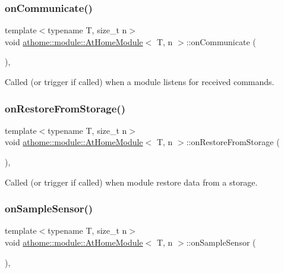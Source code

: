 \subsubsection{\texorpdfstring{on\+Communicate()}{onCommunicate()}}
{\footnotesize\ttfamily template$<$typename T, size\+\_\+t n$>$ \\
void \mbox{\hyperlink{classathome_1_1module_1_1_at_home_module}{athome\+::module\+::\+At\+Home\+Module}}$<$ T, n $>$\+::on\+Communicate (\begin{DoxyParamCaption}{ }\end{DoxyParamCaption})\hspace{0.3cm}{\ttfamily [inline]}, {\ttfamily [protected]}}

Called (or trigger if called) when a module listens for received commands. \mbox{\label{classathome_1_1module_1_1_at_home_module_a7608679045f46ef0c07d7eab430d755b}} 
\subsubsection{\texorpdfstring{on\+Restore\+From\+Storage()}{onRestoreFromStorage()}}
{\footnotesize\ttfamily template$<$typename T, size\+\_\+t n$>$ \\
void \mbox{\hyperlink{classathome_1_1module_1_1_at_home_module}{athome\+::module\+::\+At\+Home\+Module}}$<$ T, n $>$\+::on\+Restore\+From\+Storage (\begin{DoxyParamCaption}{ }\end{DoxyParamCaption})\hspace{0.3cm}{\ttfamily [inline]}, {\ttfamily [protected]}}

Called (or trigger if called) when module restore data from a storage. \mbox{\label{classathome_1_1module_1_1_at_home_module_a0c78d6ba7b9784d1a895bd9f109bd048}} 
\subsubsection{\texorpdfstring{on\+Sample\+Sensor()}{onSampleSensor()}}
{\footnotesize\ttfamily template$<$typename T, size\+\_\+t n$>$ \\
void \mbox{\hyperlink{classathome_1_1module_1_1_at_home_module}{athome\+::module\+::\+At\+Home\+Module}}$<$ T, n $>$\+::on\+Sample\+Sensor (\begin{DoxyParamCaption}{ }\end{DoxyParamCaption})\hspace{0.3cm}{\ttfamily [inline]}, {\ttfamily [protected]}}


